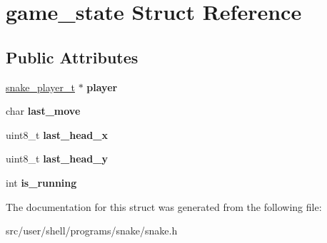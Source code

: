 \hypertarget{structgame__state}{}\section{game\+\_\+state Struct Reference}
\label{structgame__state}
\subsection*{Public Attributes}
\begin{DoxyCompactItemize}
\item 
\mbox{\label{structgame__state_a10306c3522cbea8dc1fe28a497cae62d}} 
\hyperlink{structsnake__player}{snake\+\_\+player\+\_\+t} $\ast$ {\bfseries player}
\item 
\mbox{\label{structgame__state_a491b5c70e5f1696d37c49f1175d0dbf1}} 
char {\bfseries last\+\_\+move}
\item 
\mbox{\label{structgame__state_ac3f389116f44019310c31073e98414be}} 
uint8\+\_\+t {\bfseries last\+\_\+head\+\_\+x}
\item 
\mbox{\label{structgame__state_ae7d2cee339a8e0a8d3d6a6e394c13955}} 
uint8\+\_\+t {\bfseries last\+\_\+head\+\_\+y}
\item 
\mbox{\label{structgame__state_a97c57918ab24d615c26082cd1de69ad4}} 
int {\bfseries is\+\_\+running}
\end{DoxyCompactItemize}


The documentation for this struct was generated from the following file\+:\begin{DoxyCompactItemize}
\item 
src/user/shell/programs/snake/snake.\+h\end{DoxyCompactItemize}
